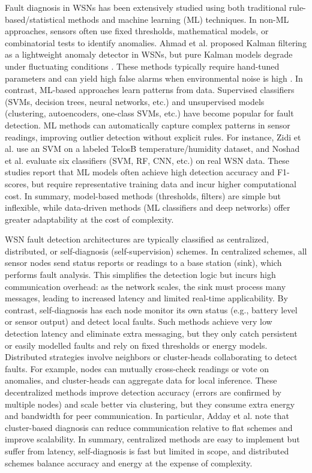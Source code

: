 Fault diagnosis in WSNs has been extensively studied using both traditional rule-based/statistical methods and machine learning (ML) techniques. In non-ML approaches, sensors often use fixed thresholds, mathematical models, or combinatorial tests to identify anomalies. Ahmad et al. proposed Kalman filtering as a lightweight anomaly detector in WSNs, but pure Kalman models degrade under fluctuating conditions \cite{Ahmad2024}. These methods typically require hand-tuned parameters and can yield high false alarms when environmental noise is high \cite{Muhammed2017, Zhang2018}.  In contrast, ML-based approaches learn patterns from data. Supervised classifiers (SVMs, decision trees, neural networks, etc.) and unsupervised models (clustering, autoencoders, one-class SVMs, etc.) have become popular for fault detection. ML methods can automatically capture complex patterns in sensor readings, improving outlier detection without explicit rules. For instance, Zidi et al. use an SVM on a labeled TelosB temperature/humidity dataset, and Noshad et al. evaluate six classifiers (SVM, RF, CNN, etc.) on real WSN data. These studies report that ML models often achieve high detection accuracy and F1-scores, but require representative training data and incur higher computational cost. In summary, model-based methods (thresholds, filters) are simple but inflexible, while data-driven methods (ML classifiers and deep networks) offer greater adaptability at the cost of complexity.

WSN fault detection architectures are typically classified as centralized, distributed, or self-diagnosis (self-supervision) schemes. In centralized schemes, all sensor nodes send status reports or readings to a base station (sink), which performs fault analysis. This simplifies the detection logic but incurs high communication overhead: as the network scales, the sink must process many messages, leading to increased latency and limited real-time applicability. By contrast, self-diagnosis has each node monitor its own status (e.g., battery level or sensor output) and detect local faults. Such methods achieve very low detection latency and eliminate extra messaging, but they only catch persistent or easily modelled faults and rely on fixed thresholds or energy models. Distributed strategies involve neighbors or cluster-heads collaborating to detect faults. For example, nodes can mutually cross-check readings or vote on anomalies, and cluster-heads can aggregate data for local inference. These decentralized methods improve detection accuracy (errors are confirmed by multiple nodes) and scale better via clustering, but they consume extra energy and bandwidth for peer communication. In particular, Adday et al. note that cluster-based diagnosis can reduce communication relative to flat schemes and improve scalability. In summary, centralized methods are easy to implement but suffer from latency, self-diagnosis is fast but limited in scope, and distributed schemes balance accuracy and energy at the expense of complexity.

